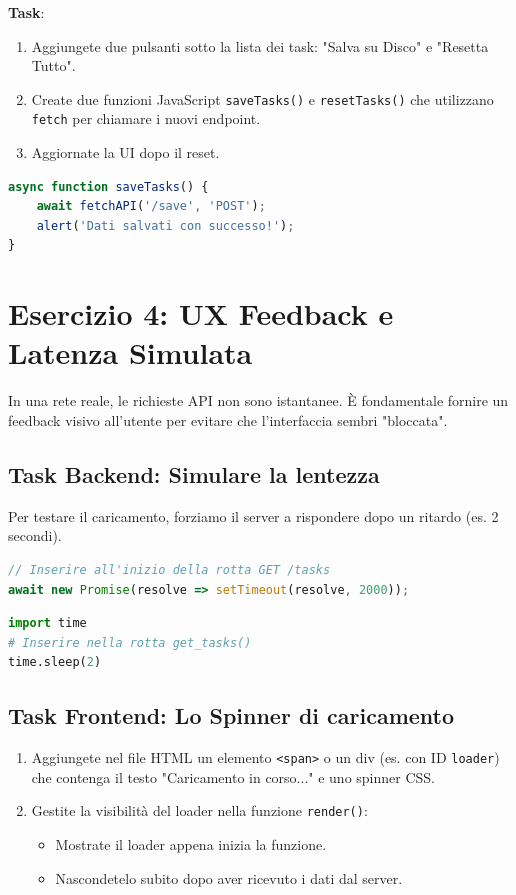 \documentclass[11pt,a4paper]{article}
\begin{document}
\textbf{Task}:
\begin{enumerate}
    \item Aggiungete due pulsanti sotto la lista dei task: "Salva su Disco" e "Resetta Tutto".
    \item Create due funzioni JavaScript \texttt{saveTasks()} e \texttt{resetTasks()} che utilizzano \texttt{fetch} per chiamare i nuovi endpoint.
    \item Aggiornate la UI dopo il reset.
\end{enumerate}

\begin{lstlisting}[language=javascript]
async function saveTasks() {
    await fetchAPI('/save', 'POST');
    alert('Dati salvati con successo!');
}
\end{lstlisting}

\section{Esercizio 4: UX Feedback e Latenza Simulata}
In una rete reale, le richieste API non sono istantanee. È fondamentale fornire un feedback visivo all'utente per evitare che l'interfaccia sembri "bloccata".

\subsection{Task Backend: Simulare la lentezza}
Per testare il caricamento, forziamo il server a rispondere dopo un ritardo (es. 2 secondi).

\begin{lstlisting}[language=javascript, caption=Ritardo in Node.js]
// Inserire all'inizio della rotta GET /tasks
await new Promise(resolve => setTimeout(resolve, 2000));
\end{lstlisting}

\begin{lstlisting}[language=Python, caption=Ritardo in Python]
import time
# Inserire nella rotta get_tasks()
time.sleep(2)
\end{lstlisting}

\subsection{Task Frontend: Lo Spinner di caricamento}
\begin{enumerate}
    \item Aggiungete nel file HTML un elemento \texttt{<span>} o un div (es. con ID \texttt{loader}) che contenga il testo "Caricamento in corso..." e uno spinner CSS.
    \item Gestite la visibilità del loader nella funzione \texttt{render()}:
    \begin{itemize}
        \item Mostrate il loader appena inizia la funzione.
        \item Nascondetelo subito dopo aver ricevuto i dati dal server.
    \end{itemize}
\end{enumerate}
\end{document}
